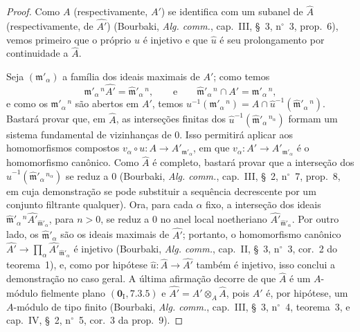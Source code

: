 \begin{proof}
Como $A$ (respectivamente,
$A'$) se identifica com
um subanel de $\widehat A$
(respectivamente, de
$\widehat{A'}$)
(Bourbaki, \emph{Alg. comm.},
cap.~III, \S~3,
n$^\circ$~3, prop.~6),
vemos primeiro que o
próprio $u$ é injetivo e
que $\widehat u$ é seu
prolongamento por
continuidade a
$\widehat A$.

Seja $(\mathfrak m'_\alpha)$
a família dos ideais
maximais de $A'$; como
temos
\[
\mathfrak m'_\alpha{}^{\,n}
\widehat{A'}
=\widehat{\mathfrak m}'_\alpha{}^{\,n},
\qquad\text{e}\qquad
\widehat{\mathfrak m}'_\alpha{}^{\,n}
\cap A'
=\mathfrak m'_\alpha{}^{\,n},
\]
e como os
$\mathfrak m'_\alpha{}^{\,n}$
são abertos em $A'$,
temos
$u^{-1}(\mathfrak m'_\alpha{}^{\,n})
=A\cap\widehat u^{-1}(
\widehat{\mathfrak m}'_\alpha{}^{\,n})$.
Bastará provar que, em
$\widehat A$, as
interseções finitas dos
$\widehat u^{-1}(
\widehat{\mathfrak m}'_\alpha{}^{\,n_\alpha})$
formam um sistema
fundamental de vizinhanças
de $0$. Isso permitirá
aplicar 
aos homomorfismos
compostos
$v_\alpha\circ u:A\to
A'_{\mathfrak m'_\alpha}$,
em que $v_\alpha:A'\to
A'_{\mathfrak m'_\alpha}$
é o homomorfismo canônico.
Como $\widehat A$ é
completo, bastará provar
que a interseção dos
$\widehat u^{-1}(
\widehat{\mathfrak m}'_\alpha{}^{\,n_\alpha})$
se reduz a $0$
(Bourbaki, \emph{Alg. comm.},
cap.~III, \S~2,
n$^\circ$~7, prop.~8,
em cuja demonstração se
pode substituir a sequência
decrescente por um conjunto
filtrante qualquer). Ora,
para cada $\alpha$
fixo, a interseção dos
ideais
$\widehat{\mathfrak m}'_\alpha{}^{\,n}
\widehat{A'}_{\widehat{\mathfrak m}'_\alpha}$,
para $n>0$, se reduz a
$0$ no anel local
noetheriano
$\widehat{A'}_{\widehat{\mathfrak m}'_\alpha}$.
Por outro lado, os
$\widehat{\mathfrak m}'_\alpha$
são os ideais maximais de
$\widehat{A'}$; portanto,
o homomorfismo canônico
$\widehat{A'}\to
\prod_\alpha
\widehat{A'}_{\widehat{\mathfrak m}'_\alpha}$
é injetivo (Bourbaki,
\emph{Alg. comm.}, cap.~II,
\S~3, n$^\circ$~3,
cor.~2 do teorema~1), e,
como por hipótese
$\widehat u:\widehat A\to
\widehat{A'}$ também é
injetivo, isso conclui a
demonstração no caso geral.
A última afirmação decorre
de que $\widehat A$ é um
$A$-módulo fielmente plano
$(\mathbf{0}_{\mathrm I},
7.3.5)$ e
$\widehat{A'}=
A'\otimes_A\widehat A$,
pois $A'$ é, por hipótese,
um $A$-módulo de tipo
finito (Bourbaki,
\emph{Alg. comm.}, cap.~III,
\S~3, n$^\circ$~4,
teorema~3, e cap.~IV,
\S~2, n$^\circ$~5,
cor.~3 da prop.~9).
\end{proof}

